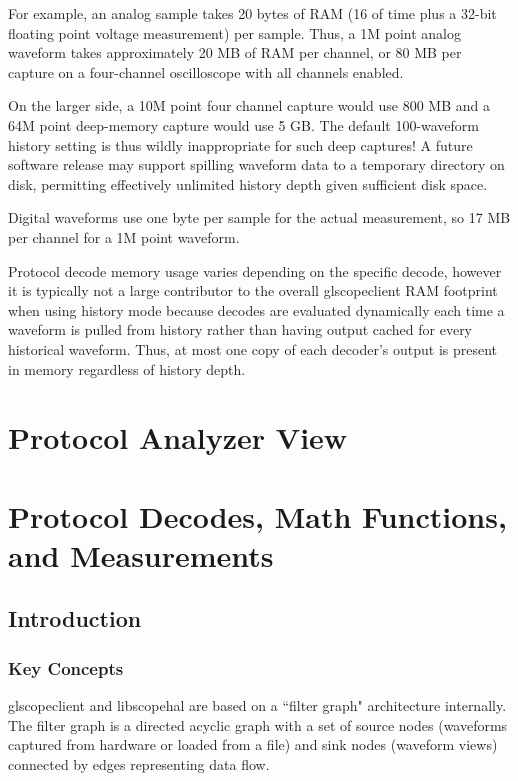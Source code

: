 \documentclass[11pt]{article}
\begin{document}
For example, an analog sample takes 20 bytes of RAM (16 of time plus a 32-bit floating point voltage measurement) per
sample. Thus, a 1M point analog waveform takes approximately 20 MB of RAM per channel, or 80 MB per capture on a
four-channel oscilloscope with all channels enabled.

On the larger side, a 10M point four channel capture would use 800 MB and a 64M point deep-memory capture would use 5
GB. The default 100-waveform history setting is thus wildly inappropriate for such deep captures! A future software
release may support spilling waveform data to a temporary directory on disk, permitting effectively unlimited history
depth given sufficient disk space.

Digital waveforms use one byte per sample for the actual measurement, so 17 MB per channel for a 1M point waveform.

Protocol decode memory usage varies depending on the specific decode, however it is typically not a large contributor
to the overall glscopeclient RAM footprint when using history mode because decodes are evaluated dynamically each time
a waveform is pulled from history rather than having output cached for every historical waveform. Thus, at most one
copy of each decoder's output is present in memory regardless of history depth.

\pagebreak
\section{Protocol Analyzer View}

\pagebreak
\section{Protocol Decodes, Math Functions, and Measurements}

\subsection{Introduction}

\subsubsection{Key Concepts}

glscopeclient and libscopehal are based on a ``filter graph" architecture internally. The filter graph is a directed
acyclic graph with a set of source nodes (waveforms captured from hardware or loaded from a file) and sink nodes
(waveform views) connected by edges representing data flow.
\end{document}

